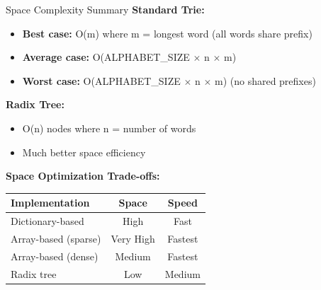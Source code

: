 \documentclass[aspectratio=169]{beamer}
\begin{document}
\begin{frame}{Space Complexity Summary}
  \textbf{Standard Trie:}
  \begin{itemize}
    \item \textbf{Best case:} O(m) where m = longest word (all words share prefix)
    \item \textbf{Average case:} O(ALPHABET\_SIZE $\times$ n $\times$ m)
    \item \textbf{Worst case:} O(ALPHABET\_SIZE $\times$ n $\times$ m) (no shared prefixes)
  \end{itemize}

  \vspace{0.3cm}
  \textbf{Radix Tree:}
  \begin{itemize}
    \item O(n) nodes where n = number of words
    \item Much better space efficiency
  \end{itemize}

  \vspace{0.3cm}
  \textbf{Space Optimization Trade-offs:}
  \begin{table}
    \centering
    \small
    \begin{tabular}{|l|c|c|}
      \hline
      \textbf{Implementation} & \textbf{Space} & \textbf{Speed} \\
      \hline
      Dictionary-based & High & Fast \\
      \hline
      Array-based (sparse) & Very High & Fastest \\
      \hline
      Array-based (dense) & Medium & Fastest \\
      \hline
      Radix tree & Low & Medium \\
      \hline
    \end{tabular}
  \end{table}
\end{frame}
\end{document}
